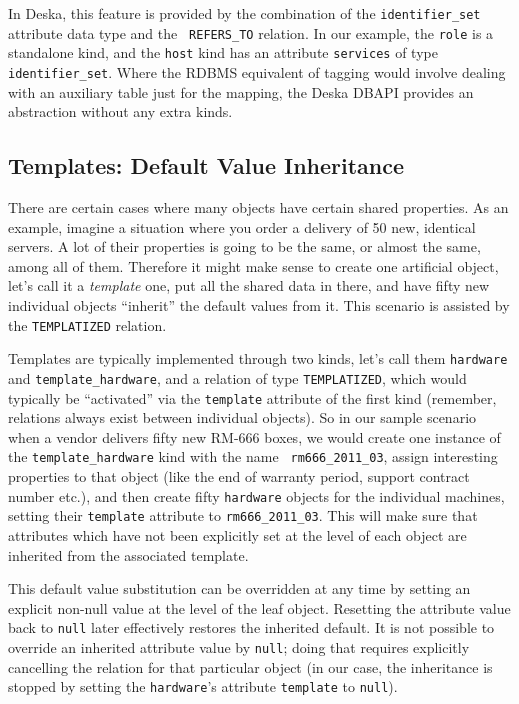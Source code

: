 \documentclass[deska]{subfiles}
\begin{document}
In Deska, this feature is provided by the combination of the {\tt identifier\_set} attribute data type and the {\tt
REFERS\_TO} relation.  In our example, the {\tt role} is a standalone kind, and the {\tt host} kind has an attribute
{\tt services} of type {\tt identifier\_set}.  Where the RDBMS equivalent of tagging would involve dealing with an
auxiliary table just for the mapping, the Deska DBAPI provides an abstraction without any extra kinds.

\subsection{Templates: Default Value Inheritance}

There are certain cases where many objects have certain shared properties.  As an example, imagine a situation where you
order a delivery of 50 new, identical servers.  A lot of their properties is going to be the same, or almost the same,
among all of them.  Therefore it might make sense to create one artificial object, let's call it a {\em template} one,
put all the shared data in there, and have fifty new individual objects ``inherit'' the default values from it.  This
scenario is assisted by the {\tt TEMPLATIZED} relation.

Templates are typically implemented through two kinds, let's call them {\tt hardware} and {\tt template\_hardware}, and
a relation of type {\tt TEMPLATIZED}, which would typically be ``activated'' via the {\tt template} attribute of the
first kind (remember, relations always exist between individual objects).  So in our sample scenario when a vendor
delivers fifty new RM-666 boxes, we would create one instance of the {\tt template\_hardware} kind with the name {\tt
rm666\_2011\_03}, assign interesting properties to that object (like the end of warranty period, support contract number
etc.), and then create fifty {\tt hardware} objects for the individual machines, setting their {\tt template} attribute
to {\tt rm666\_2011\_03}.  This will make sure that attributes which have not been explicitly set at the level of each
object are inherited from the associated template.

This default value substitution can be overridden at any time by setting an explicit non-null value at the level of the
leaf object.  Resetting the attribute value back to {\tt null} later effectively restores the inherited default.  It is
not possible to override an inherited attribute value by {\tt null}; doing that requires explicitly cancelling the
relation for that particular object (in our case, the inheritance is stopped by setting the {\tt hardware}'s attribute
{\tt template} to {\tt null}).
\end{document}
